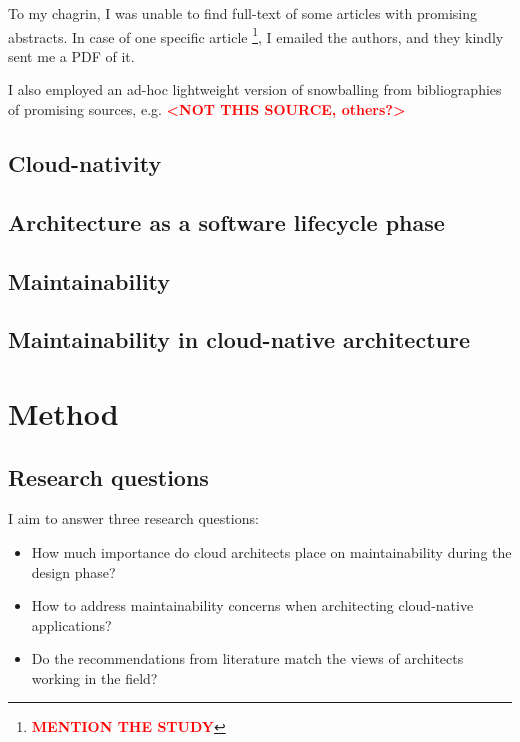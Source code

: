 \documentclass[utf8,english]{gradu3}
\newcommand{\todo}[1]{\textbf{\textcolor{red}{#1}}}
\begin{document}
To my chagrin, I was unable to find full-text of some articles with promising abstracts.
In case of one specific article \footnote{\todo{MENTION THE STUDY}}, I emailed the authors, and they kindly sent me a PDF of it.

I also employed an ad-hoc lightweight version of snowballing from bibliographies of
promising sources, e.g. \textcite{thesis-time-tracking} \todo{<NOT THIS SOURCE, others?>}
\section{Cloud-nativity}

\section{Architecture as a software lifecycle phase}

\section{Maintainability}

\section{Maintainability in cloud-native architecture}

\chapter{Method}

\section{Research questions}

I aim to answer three research questions:
\begin{itemize}
  \item How much importance do cloud architects place on maintainability during
        the design phase?
  \item How to address maintainability concerns when architecting cloud-native
        applications?
  \item Do the recommendations from literature match the views of architects
        working in the field?
\end{itemize}
\end{document}
